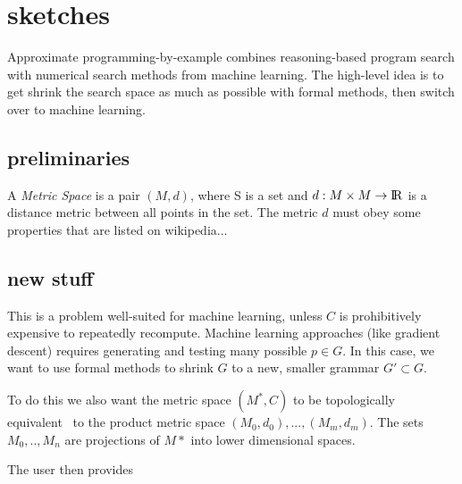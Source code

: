 \section{sketches}

Approximate programming-by-example combines reasoning-based program search with numerical search methods from machine learning.
The high-level idea is to get shrink the search space as much as possible with formal methods, then switch over to machine learning.


\subsection{preliminaries}
A \textit{Metric Space} is a pair $(M,d)$, where S is a set and $d:M \times M \to {\rm I\!R}$ is a distance metric between all points in the set. The metric $d$ must obey some properties that are listed on wikipedia...

\iffalse
I think I dont need this actually
A product metric $(X^{*},d_p)$ is a metric space over the Cartesian product of finitely many metric spaces $(X_0,d_0),...,(X_n,d_n)$,
  where $d_p:X^n \times X^n \to \reals$ also obey those properties.
If $d_p$ is a norm ``which is non-decreasing as the coordinates of a positive n-tuple increase``\footnote{took this from \url{https://en.wikipedia.org/wiki/Metric_space#Product_metric_spaces}, not sure how to formalize it yet}, then then topology of the X^* is equivelant
\fi

\subsection{new stuff}

This is a problem well-suited for machine learning, unless $C$ is prohibitively expensive to repeatedly recompute.
Machine learning approaches (like gradient descent) requires generating and testing many possible $p \in G$.
In this case, we want to use formal methods to shrink $G$ to a new, smaller grammar $G' \subset G$.

To do this we also want the metric space $(M^{*},C)$ to be topologically equivalent~\cite{bishop1980tensor} to the product metric space $(M_0,d_0),...,(M_m,d_m)$.
The sets $M_0,..,M_n$ are projections of $M{*}$ into lower dimensional spaces.

The user then provides 

